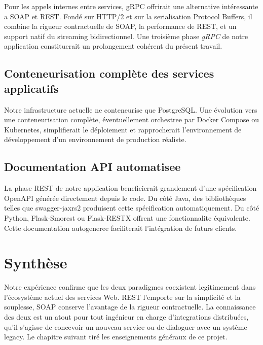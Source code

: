 Pour les appels internes entre services, gRPC offrirait une alternative intéressante a SOAP et REST. Fondé sur HTTP/2 et sur la serialisation Protocol Buffers, il combine la rigueur contractuelle de SOAP, la performance de REST, et un support natif du streaming bidirectionnel. Une troisième phase \emph{gRPC} de notre application constituerait un prolongement cohérent du présent travail.

\subsection{Conteneurisation complète des services applicatifs}

Notre infrastructure actuelle ne conteneurise que PostgreSQL. Une évolution vers une conteneurisation complète, éventuellement orchestree par Docker Compose ou Kubernetes, simplifierait le déploiement et rapprocherait l'environnement de développement d'un environnement de production réaliste.

\subsection{Documentation API automatisee}

La phase REST de notre application beneficierait grandement d'une spécification OpenAPI générée directement depuis le code. Du côté Java, des bibliothèques telles que swagger-jaxrs2 produisent cette spécification automatiquement. Du côté Python, Flask-Smorest ou Flask-RESTX offrent une fonctionnalite équivalente. Cette documentation autogeneree faciliterait l'intégration de futurs clients.

\section{Synthèse}

Notre expérience confirme que les deux paradigmes coexistent legitimement dans l'écosystème actuel des services Web. REST l'emporte sur la simplicité et la souplesse, SOAP conserve l'avantage de la rigueur contractuelle. La connaissance des deux est un atout pour tout ingénieur en charge d'integrations distribuées, qu'il s'agisse de concevoir un nouveau service ou de dialoguer avec un système legacy. Le chapitre suivant tiré les enseignements généraux de ce projet.
